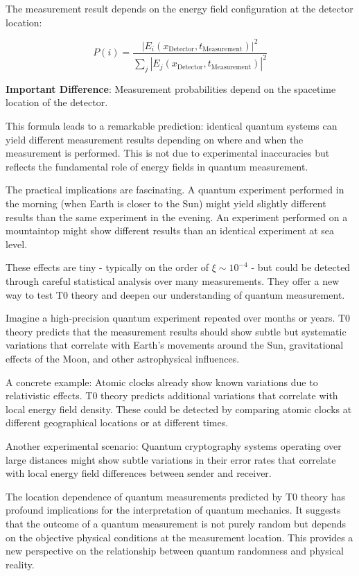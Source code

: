 \documentclass[12pt,a4paper]{article}
\newcommand{\xipar}{\xi}
\theoremstyle{definition}
\theoremstyle{remark}
\begin{document}
The measurement result depends on the energy field configuration at the detector location:

\begin{equation}
	P(i) = \frac{|E_i(x_{\text{Detector}}, t_{\text{Measurement}})|^2}{\sum_j |E_j(x_{\text{Detector}}, t_{\text{Measurement}})|^2}
	\label{eq:measurement_probability}
\end{equation}

\textbf{Important Difference}: Measurement probabilities depend on the spacetime location of the detector.

This formula leads to a remarkable prediction: identical quantum systems can yield different measurement results depending on where and when the measurement is performed. This is not due to experimental inaccuracies but reflects the fundamental role of energy fields in quantum measurement.

The practical implications are fascinating. A quantum experiment performed in the morning (when Earth is closer to the Sun) might yield slightly different results than the same experiment in the evening. An experiment performed on a mountaintop might show different results than an identical experiment at sea level.

These effects are tiny - typically on the order of $\xipar \sim 10^{-4}$ - but could be detected through careful statistical analysis over many measurements. They offer a new way to test T0 theory and deepen our understanding of quantum measurement.

Imagine a high-precision quantum experiment repeated over months or years. T0 theory predicts that the measurement results should show subtle but systematic variations that correlate with Earth's movements around the Sun, gravitational effects of the Moon, and other astrophysical influences.

A concrete example: Atomic clocks already show known variations due to relativistic effects. T0 theory predicts additional variations that correlate with local energy field density. These could be detected by comparing atomic clocks at different geographical locations or at different times.

Another experimental scenario: Quantum cryptography systems operating over large distances might show subtle variations in their error rates that correlate with local energy field differences between sender and receiver.

The location dependence of quantum measurements predicted by T0 theory has profound implications for the interpretation of quantum mechanics. It suggests that the outcome of a quantum measurement is not purely random but depends on the objective physical conditions at the measurement location. This provides a new perspective on the relationship between quantum randomness and physical reality.
\end{document}
